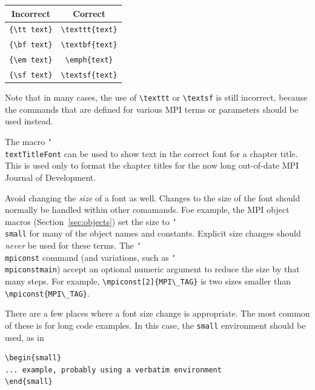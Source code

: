 \documentclass[letterpaper,twoside,11pt,fleqn]{article}
\def\cmd#1{\texttt{\char`\\#1}}
\def\MPI/{\textsf{MPI}}    %
\begin{document}
\begin{center}
\begin{tabular}{|c|c|}\hline
\textbf{Incorrect}&\textbf{Correct}\\\hline
\verb+{\tt text}+&\verb+\texttt{text}+\\
\verb+{\bf text}+&\verb+\textbf{text}+\\
\verb+{\em text}+&\verb+\emph{text}+\\
\verb+{\sf text}+&\verb+\textsf{text}+\\\hline
\end{tabular}
\end{center}
Note that in many cases, the use of \verb+\texttt+ or \verb+\textsf+
is still incorrect, because the commands that are defined for various
\MPI/ terms or parameters should be used instead.

The macro \cmd{textTitleFont} can be used to show text in the correct
font for a chapter title.
This is used only to format the chapter titles for the now long
out-of-date MPI Journal of Development.

Avoid changing the \emph{size} of a font as well.
Changes to the size of the font should normally be handled within
other comamands.
Foe example, the MPI object macros (Section~\ref{sec:objects}) set the
size to \cmd{small} for many of the object names and constants.
Explicit size changes should \emph{never} be used for these terms.
The \cmd{mpiconst} command (and variations, such as
\cmd{mpiconstmain}) accept an optional numeric argument to reduce the
size by that many steps.
For example, \verb+\mpiconst[2]{MPI\_TAG}+ is two sizes smaller than
\verb+\mpiconst{MPI\_TAG}+.

There are a few places where a font size change is appropriate.
The most common of these is for long code examples.
In this case, the \texttt{small} environment should be used, as in
\begin{verbatim}
\begin{small}
... example, probably using a verbatim environment
\end{small}
\end{verbatim}
\end{document}
